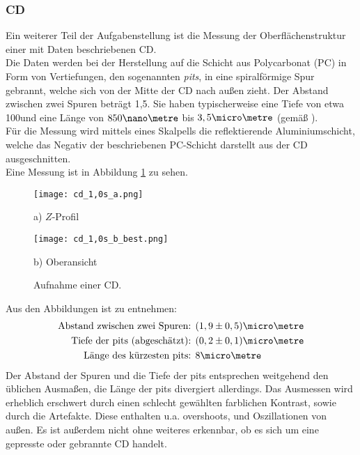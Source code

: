 \subsubsection{CD}
Ein weiterer Teil der Aufgabenstellung ist die Messung der Oberflächenstruktur einer mit Daten beschriebenen CD.\\
Die Daten werden bei der Herstellung auf die Schicht aus Polycarbonat (PC) in Form von Vertiefungen, den sogenannten \emph{pits}, in eine spiralförmige Spur gebrannt, welche sich von der Mitte der CD nach außen zieht. Der Abstand zwischen zwei Spuren beträgt 1,5\micro\metre. Sie haben typischerweise eine Tiefe von etwa 100\nano\metre und eine Länge von $850\nano\metre$ bis $3,5\micro\metre$ (gemäß \cite{lit:wiki_cd}).\\
Für die Messung wird mittels eines Skalpells die reflektierende Aluminiumschicht, welche das Negativ der beschriebenen PC-Schicht darstellt aus der CD ausgeschnitten.\\
Eine Messung ist in Abbildung \ref{fig:CD} zu sehen.
\begin{figure}[h]
\centering
	\begin{minipage}{0.45\textwidth}
	\centering
		\texttt{[image: cd\_1,0s\_a.png]}
		\caption*{a) $Z$-Profil}
	\end{minipage}
	\hfill
	\begin{minipage}{0.45\textwidth}
	\centering
		\texttt{[image: cd\_1,0s\_b\_best.png]}
		\caption*{b) Oberansicht}
	\end{minipage}
	\caption{Aufnahme einer CD.}
	\label{fig:CD}
\end{figure}
Aus den Abbildungen ist zu entnehmen:
\begin{align*}
\text{Abstand zwischen zwei Spuren: }& (1,9\pm0,5)\micro\metre\\
\text{Tiefe der pits (abgeschätzt): }& (0,2\pm0,1)\micro\metre\\
\text{Länge des kürzesten pits: }& 8\micro\metre 
\end{align*}
Der Abstand der Spuren und die Tiefe der pits entsprechen weitgehend den üblichen Ausmaßen, die Länge der pits divergiert allerdings. Das Ausmessen wird erheblich erschwert durch einen schlecht gewählten farblichen Kontrast, sowie durch die Artefakte. Diese enthalten u.a. overshoots, und Oszillationen von außen. Es ist außerdem nicht ohne weiteres erkennbar, ob es sich um eine gepresste oder gebrannte CD handelt.
